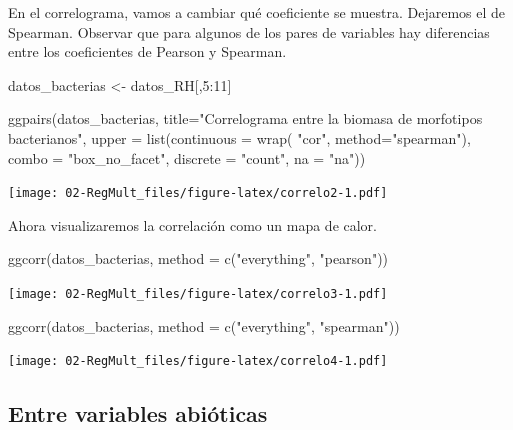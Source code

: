 \documentclass[
]{book}
\newenvironment{Shaded}{\begin{snugshade}}{\end{snugshade}}
\newcommand{\AttributeTok}[1]{\textcolor[rgb]{0.77,0.63,0.00}{#1}}
\newcommand{\DecValTok}[1]{\textcolor[rgb]{0.00,0.00,0.81}{#1}}
\newcommand{\FunctionTok}[1]{\textcolor[rgb]{0.00,0.00,0.00}{#1}}
\newcommand{\NormalTok}[1]{#1}
\newcommand{\OtherTok}[1]{\textcolor[rgb]{0.56,0.35,0.01}{#1}}
\newcommand{\SpecialCharTok}[1]{\textcolor[rgb]{0.00,0.00,0.00}{#1}}
\newcommand{\StringTok}[1]{\textcolor[rgb]{0.31,0.60,0.02}{#1}}
\begin{document}
En el correlograma, vamos a cambiar qué coeficiente se muestra. Dejaremos el de Spearman. Observar que para algunos de los pares de variables hay diferencias entre los coeficientes de Pearson y Spearman.

\begin{Shaded}
\begin{Highlighting}[]
\NormalTok{datos\_bacterias }\OtherTok{\textless{}{-}}\NormalTok{ datos\_RH[,}\DecValTok{5}\SpecialCharTok{:}\DecValTok{11}\NormalTok{]}
  
\FunctionTok{ggpairs}\NormalTok{(datos\_bacterias, }\AttributeTok{title=}\StringTok{"Correlograma entre la biomasa de morfotipos bacterianos"}\NormalTok{, }\AttributeTok{upper =} \FunctionTok{list}\NormalTok{(}\AttributeTok{continuous =} \FunctionTok{wrap}\NormalTok{( }\StringTok{"cor"}\NormalTok{, }\AttributeTok{method=}\StringTok{"spearman"}\NormalTok{), }\AttributeTok{combo =} \StringTok{"box\_no\_facet"}\NormalTok{, }\AttributeTok{discrete =} \StringTok{"count"}\NormalTok{, }\AttributeTok{na =}  \StringTok{"na"}\NormalTok{)) }
\end{Highlighting}
\end{Shaded}

\texttt{[image: 02-RegMult\_files/figure-latex/correlo2-1.pdf]}

Ahora visualizaremos la correlación como un mapa de calor.

\begin{Shaded}
\begin{Highlighting}[]
\FunctionTok{ggcorr}\NormalTok{(datos\_bacterias, }\AttributeTok{method =} \FunctionTok{c}\NormalTok{(}\StringTok{"everything"}\NormalTok{, }\StringTok{"pearson"}\NormalTok{)) }
\end{Highlighting}
\end{Shaded}

\texttt{[image: 02-RegMult\_files/figure-latex/correlo3-1.pdf]}

\begin{Shaded}
\begin{Highlighting}[]
\FunctionTok{ggcorr}\NormalTok{(datos\_bacterias, }\AttributeTok{method =} \FunctionTok{c}\NormalTok{(}\StringTok{"everything"}\NormalTok{, }\StringTok{"spearman"}\NormalTok{)) }
\end{Highlighting}
\end{Shaded}

\texttt{[image: 02-RegMult\_files/figure-latex/correlo4-1.pdf]}

\hypertarget{entre-variables-abiuxf3ticas}{%
\subsection{Entre variables abióticas}\label{entre-variables-abiuxf3ticas}}
\end{document}
